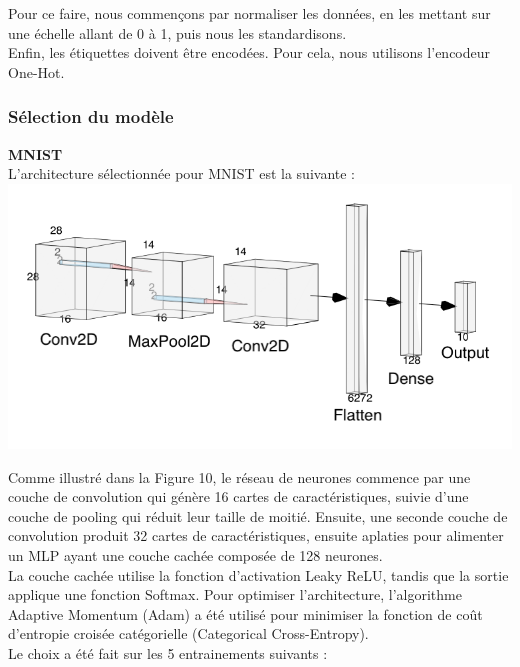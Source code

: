 \begin{multicols}{2}
Pour ce faire, nous commençons par normaliser les données, en les mettant sur une 
échelle allant de 0 à 1, puis nous les standardisons.\\

Enfin, les étiquettes doivent être encodées. Pour cela, nous utilisons l’encodeur One-Hot.\\

\subsubsection{Sélection du modèle}

\textbf{MNIST} \\

L'architecture sélectionnée pour MNIST est la suivante : \\

\includegraphics[width=\columnwidth]{images/mnist_nn.png}
\hfill\break

Comme illustré dans la Figure 10, le réseau de neurones commence par une couche de convolution qui 
génère 16 cartes de caractéristiques, suivie d’une couche de pooling qui réduit leur taille de moitié.
Ensuite, une seconde couche de convolution produit 32 cartes de caractéristiques, ensuite aplaties pour alimenter 
un MLP ayant une couche cachée composée de 128 neurones. \\

La couche cachée utilise la fonction d’activation Leaky ReLU, tandis que la sortie 
applique une fonction Softmax. Pour optimiser l'architecture, l’algorithme Adaptive Momentum (Adam) a été utilisé pour minimiser 
la fonction de coût d’entropie croisée catégorielle (Categorical Cross-Entropy). \\

Le choix a été fait sur les 5 entrainements suivants : \\


\end{multicols}

